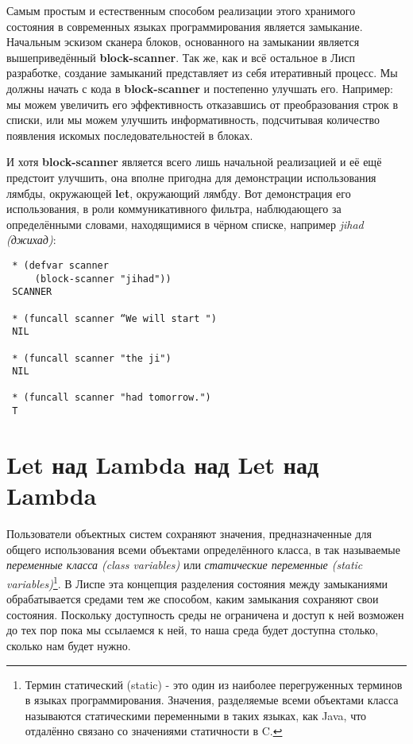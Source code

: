 Самым простым и естественным способом реализации этого хранимого состояния в современных языках программирования является замыкание. Начальным эскизом сканера блоков, основанного на замыкании является вышеприведённый \textbf{block-scanner}. Так же, как и всё остальное в Лисп разработке, создание замыканий представляет из себя итеративный процесс. Мы должны начать с кода в \textbf{block-scanner} и постепенно улучшать его. Например: мы можем увеличить его эффективность отказавшись от преобразования строк в списки, или мы можем улучшить информативность, подсчитывая количество появления искомых последовательностей в блоках.

И хотя \textbf{block-scanner} является всего лишь начальной реализацией и её ещё предстоит улучшить, она вполне пригодна для демонстрации использования лямбды, окружающей \textbf{let}, окружающий лямбду. Вот демонстрация его использования, в роли коммуникативного фильтра, наблюдающего за определёнными словами, находящимися в чёрном списке, например \emph{jihad (джихад)}:

\begin{verbatim}
 * (defvar scanner
     (block-scanner "jihad"))
 SCANNER

 * (funcall scanner “We will start ")
 NIL

 * (funcall scanner "the ji")
 NIL

 * (funcall scanner "had tomorrow.")
 T
\end{verbatim}

\section{Let над Lambda над Let над Lambda}\label{section_let_over_lambda_over_let_over_lambda}

Пользователи объектных систем сохраняют значения, предназначенные для общего использования всеми объектами определённого класса, в так называемые \emph{переменные класса (class variables)} или \emph{статические переменные (static variables)}\footnote{Термин статический (static) - это один из наиболее перегруженных терминов в языках программирования. Значения, разделяемые всеми объектами класса называются статическими переменными в таких языках, как Java, что отдалённо связано со значениями статичности в C.}. В Лиспе эта концепция разделения состояния между замыканиями обрабатывается средами тем же способом, каким замыкания сохраняют свои состояния. Поскольку доступность среды не ограничена и доступ к ней возможен до тех пор пока мы ссылаемся к ней, то наша среда будет доступна столько, сколько нам будет нужно.

